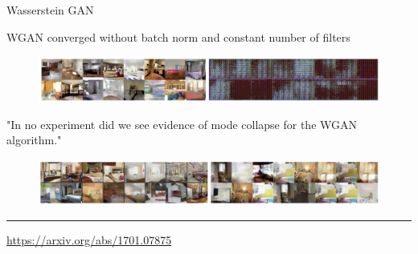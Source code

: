 \begin{frame}{Wasserstein GAN}
	\begin{block}{WGAN converged without batch norm and constant number of filters}
		\begin{figure}
			\centering
			\includegraphics[width=1.0\linewidth]{figs/wgan_convergence}
		\end{figure}
	\end{block}
	\begin{block}{"In no experiment did we see evidence of mode collapse for the WGAN algorithm."}
		\begin{figure}
			\centering
			\includegraphics[width=1.0\linewidth]{figs/wgan_mode_collapse}
		\end{figure}
	\end{block}
	\vfill
	\hrule\medskip 
	{\scriptsize \href{https://arxiv.org/abs/1701.07875}{https://arxiv.org/abs/1701.07875}}
\end{frame}

